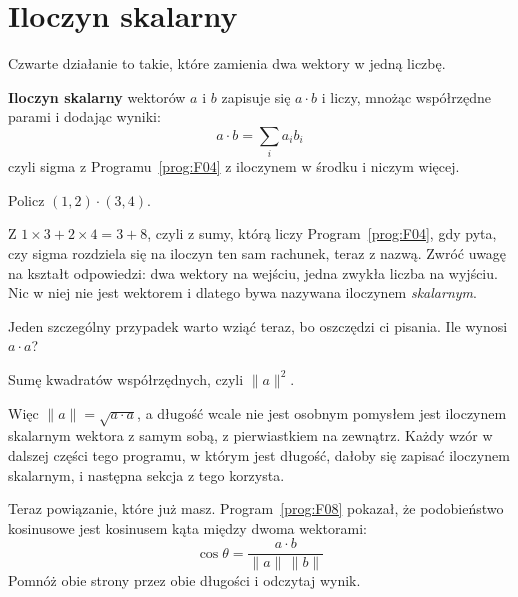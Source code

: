 \section{Iloczyn skalarny}
\label{sec:F09-dot}

\begin{fr}
Czwarte działanie to takie, które zamienia dwa wektory w jedną liczbę.

\textbf{Iloczyn skalarny} wektorów $a$ i $b$ zapisuje się $a \cdot b$ i liczy,
mnożąc współrzędne parami i dodając wyniki:
\[ a \cdot b = \sum_i a_i b_i \]
czyli sigma z Programu~\ref{prog:F04} z iloczynem w środku i niczym więcej.

Policz $(1, 2) \cdot (3, 4)$.
\nextframe
\end{fr}

\begin{fr}
Z $1 \times 3 + 2 \times 4 = 3 + 8$, czyli z sumy, którą liczy
Program~\ref{prog:F04}, gdy pyta, czy sigma rozdziela się na iloczyn \dash{}
ten sam rachunek, teraz z nazwą. Zwróć uwagę na kształt odpowiedzi: dwa
wektory na wejściu, jedna zwykła liczba na wyjściu. Nic w niej nie jest
wektorem i dlatego bywa nazywana iloczynem \emph{skalarnym}.

Jeden szczególny przypadek warto wziąć teraz, bo oszczędzi ci pisania. Ile
wynosi $a \cdot a$?
\nextframe
\end{fr}

\begin{fr}
\begin{ansblock}
Sumę kwadratów współrzędnych, czyli $\lVert a \rVert^{2}$.
\end{ansblock}

Więc $\lVert a \rVert = \sqrt{a \cdot a}$, a długość wcale nie jest osobnym
pomysłem \dash{} jest iloczynem skalarnym wektora z samym sobą, z
pierwiastkiem na zewnątrz. Każdy wzór w dalszej części tego programu, w którym
jest długość, dałoby się zapisać iloczynem skalarnym, i następna sekcja z tego
korzysta.

Teraz powiązanie, które już masz. Program~\ref{prog:F08} pokazał, że
podobieństwo kosinusowe jest kosinusem kąta między dwoma wektorami:
\[ \cos\theta = \frac{a \cdot b}{\lVert a \rVert\, \lVert b \rVert} \]
Pomnóż obie strony przez obie długości i odczytaj wynik.
\nextframe
\end{fr}

